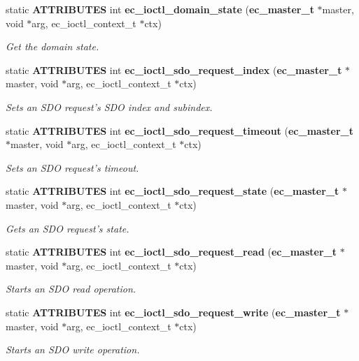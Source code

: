 \begin{DoxyCompactItemize}
static {\bf \-A\-T\-T\-R\-I\-B\-U\-T\-E\-S} int {\bf ec\-\_\-ioctl\-\_\-domain\-\_\-state} ({\bf ec\-\_\-master\-\_\-t} $\ast$master, void $\ast$arg, ec\-\_\-ioctl\-\_\-context\-\_\-t $\ast$ctx)
\begin{DoxyCompactList}\small\item\em \-Get the domain state. \end{DoxyCompactList}\item 
static {\bf \-A\-T\-T\-R\-I\-B\-U\-T\-E\-S} int {\bf ec\-\_\-ioctl\-\_\-sdo\-\_\-request\-\_\-index} ({\bf ec\-\_\-master\-\_\-t} $\ast$master, void $\ast$arg, ec\-\_\-ioctl\-\_\-context\-\_\-t $\ast$ctx)
\begin{DoxyCompactList}\small\item\em \-Sets an \-S\-D\-O request's \-S\-D\-O index and subindex. \end{DoxyCompactList}\item 
static {\bf \-A\-T\-T\-R\-I\-B\-U\-T\-E\-S} int {\bf ec\-\_\-ioctl\-\_\-sdo\-\_\-request\-\_\-timeout} ({\bf ec\-\_\-master\-\_\-t} $\ast$master, void $\ast$arg, ec\-\_\-ioctl\-\_\-context\-\_\-t $\ast$ctx)
\begin{DoxyCompactList}\small\item\em \-Sets an \-S\-D\-O request's timeout. \end{DoxyCompactList}\item 
static {\bf \-A\-T\-T\-R\-I\-B\-U\-T\-E\-S} int {\bf ec\-\_\-ioctl\-\_\-sdo\-\_\-request\-\_\-state} ({\bf ec\-\_\-master\-\_\-t} $\ast$master, void $\ast$arg, ec\-\_\-ioctl\-\_\-context\-\_\-t $\ast$ctx)
\begin{DoxyCompactList}\small\item\em \-Gets an \-S\-D\-O request's state. \end{DoxyCompactList}\item 
static {\bf \-A\-T\-T\-R\-I\-B\-U\-T\-E\-S} int {\bf ec\-\_\-ioctl\-\_\-sdo\-\_\-request\-\_\-read} ({\bf ec\-\_\-master\-\_\-t} $\ast$master, void $\ast$arg, ec\-\_\-ioctl\-\_\-context\-\_\-t $\ast$ctx)
\begin{DoxyCompactList}\small\item\em \-Starts an \-S\-D\-O read operation. \end{DoxyCompactList}\item 
static {\bf \-A\-T\-T\-R\-I\-B\-U\-T\-E\-S} int {\bf ec\-\_\-ioctl\-\_\-sdo\-\_\-request\-\_\-write} ({\bf ec\-\_\-master\-\_\-t} $\ast$master, void $\ast$arg, ec\-\_\-ioctl\-\_\-context\-\_\-t $\ast$ctx)
\begin{DoxyCompactList}\small\item\em \-Starts an \-S\-D\-O write operation. \end{DoxyCompactList}\item 

\end{DoxyCompactItemize}
